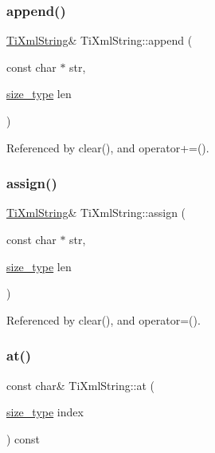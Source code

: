 \subsubsection{\texorpdfstring{append()}{append()}}
{\footnotesize\ttfamily \hyperlink{class_ti_xml_string}{Ti\+Xml\+String}\& Ti\+Xml\+String\+::append (\begin{DoxyParamCaption}\item[{const char $\ast$}]{str,  }\item[{\hyperlink{class_ti_xml_string_abeb2c1893a04c17904f7c06546d0b971}{size\+\_\+type}}]{len }\end{DoxyParamCaption})}



Referenced by clear(), and operator+=().

\hypertarget{class_ti_xml_string_afe4cd3452ccd7cd8c8cac16e24ea28d7}{}\label{class_ti_xml_string_afe4cd3452ccd7cd8c8cac16e24ea28d7} 
\subsubsection{\texorpdfstring{assign()}{assign()}}
{\footnotesize\ttfamily \hyperlink{class_ti_xml_string}{Ti\+Xml\+String}\& Ti\+Xml\+String\+::assign (\begin{DoxyParamCaption}\item[{const char $\ast$}]{str,  }\item[{\hyperlink{class_ti_xml_string_abeb2c1893a04c17904f7c06546d0b971}{size\+\_\+type}}]{len }\end{DoxyParamCaption})}



Referenced by clear(), and operator=().

\hypertarget{class_ti_xml_string_a7f33c37f7dfde5193f02521d2a7af1db}{}\label{class_ti_xml_string_a7f33c37f7dfde5193f02521d2a7af1db} 
\subsubsection{\texorpdfstring{at()}{at()}}
{\footnotesize\ttfamily const char\& Ti\+Xml\+String\+::at (\begin{DoxyParamCaption}\item[{\hyperlink{class_ti_xml_string_abeb2c1893a04c17904f7c06546d0b971}{size\+\_\+type}}]{index }\end{DoxyParamCaption}) const\hspace{0.3cm}{\ttfamily [inline]}}



